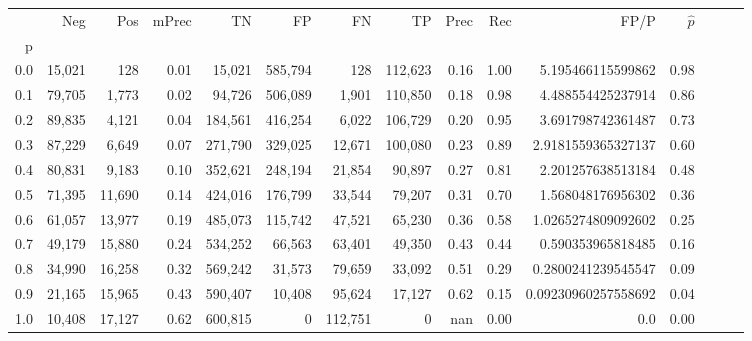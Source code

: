 \begin{tabular}{rrrrrrrrrrrrrrr}
\toprule
{} &     Neg &     Pos & mPrec &       TN &       FP &       FN &       TP &  Prec &   Rec &                 FP/P & $\hat{p}$ \\
p   &         &         &       &          &          &          &          &       &       &                      &           \\
\midrule
0.0 &  15,021 &     128 &  0.01 &   15,021 &  585,794 &      128 &  112,623 &  0.16 &  1.00 &    5.195466115599862 &      0.98 \\
0.1 &  79,705 &   1,773 &  0.02 &   94,726 &  506,089 &    1,901 &  110,850 &  0.18 &  0.98 &    4.488554425237914 &      0.86 \\
0.2 &  89,835 &   4,121 &  0.04 &  184,561 &  416,254 &    6,022 &  106,729 &  0.20 &  0.95 &    3.691798742361487 &      0.73 \\
0.3 &  87,229 &   6,649 &  0.07 &  271,790 &  329,025 &   12,671 &  100,080 &  0.23 &  0.89 &   2.9181559365327137 &      0.60 \\
0.4 &  80,831 &   9,183 &  0.10 &  352,621 &  248,194 &   21,854 &   90,897 &  0.27 &  0.81 &    2.201257638513184 &      0.48 \\
0.5 &  71,395 &  11,690 &  0.14 &  424,016 &  176,799 &   33,544 &   79,207 &  0.31 &  0.70 &    1.568048176956302 &      0.36 \\
0.6 &  61,057 &  13,977 &  0.19 &  485,073 &  115,742 &   47,521 &   65,230 &  0.36 &  0.58 &   1.0265274809092602 &      0.25 \\
0.7 &  49,179 &  15,880 &  0.24 &  534,252 &   66,563 &   63,401 &   49,350 &  0.43 &  0.44 &    0.590353965818485 &      0.16 \\
0.8 &  34,990 &  16,258 &  0.32 &  569,242 &   31,573 &   79,659 &   33,092 &  0.51 &  0.29 &   0.2800241239545547 &      0.09 \\
0.9 &  21,165 &  15,965 &  0.43 &  590,407 &   10,408 &   95,624 &   17,127 &  0.62 &  0.15 &  0.09230960257558692 &      0.04 \\
1.0 &  10,408 &  17,127 &  0.62 &  600,815 &        0 &  112,751 &        0 &   nan &  0.00 &                  0.0 &      0.00 \\
\bottomrule
\end{tabular}
